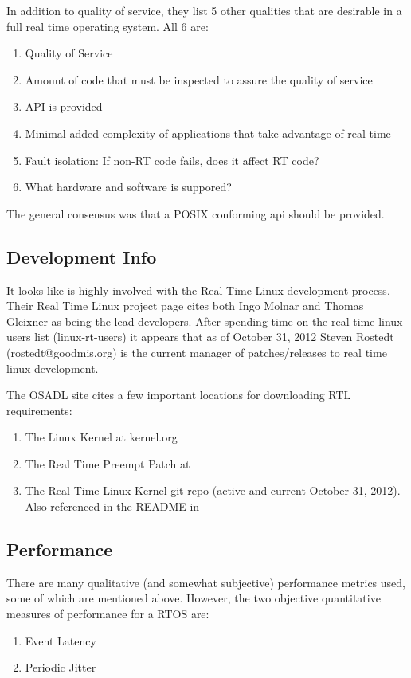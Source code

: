 \documentclass{article}
\begin{document}
In addition to quality of service, they list 5 other qualities that are desirable in a full real time operating system.  All 6 are:
\begin{enumerate}
\item Quality of Service
\item Amount of code that must be inspected to assure the quality of service
\item API is provided
\item Minimal added complexity of applications that take advantage of real time
\item Fault isolation: If non-RT code fails, does it affect RT code?
\item What hardware and software is suppored?
\end{enumerate}

The general consensus was that a POSIX conforming api should be provided.

\subsection{Development Info}
It looks like \cite{Osadl} is highly involved with the Real Time Linux development process.  Their Real Time Linux project page \cite{OsadlRealTimeLinux} cites both Ingo Molnar and Thomas Gleixner as being the lead developers.  After spending time on the real time linux users list (linux-rt-users) it appears that as of October 31, 2012 Steven Rostedt (rostedt@goodmis.org) is the current manager of patches/releases to real time linux development.

The OSADL site cites a few important locations for downloading RTL requirements:
\begin{enumerate}
\item The Linux Kernel at kernel.org
\item The Real Time Preempt Patch at \cite{RealTimeLinuxPatch}
\item The Real Time Linux Kernel git repo \cite{RealTimeLinuxGit} (active and current October 31, 2012).  Also referenced in the README in \cite{RealTimeLinuxPatch}
\end{enumerate}

\subsection{Performance}
There are many qualitative (and somewhat subjective) performance metrics used, some of which are mentioned above.  However, the two objective quantitative measures of performance for a RTOS are:
\begin{enumerate}
\item Event Latency
\item Periodic Jitter
\end{enumerate}
\end{document}
